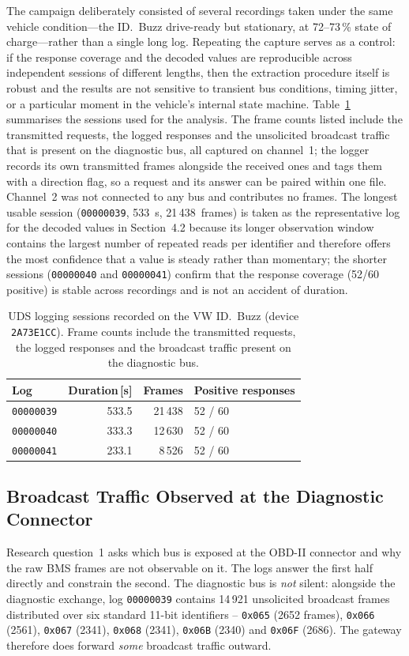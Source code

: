 \documentclass[11pt,a4paper,oneside,parskip=half]{scrreprt}
\providecommand{\hex}{}\renewcommand{\hex}[1]{\texttt{0x#1}}
\begin{document}
The campaign deliberately consisted of several recordings taken under the same vehicle condition---the ID.~Buzz drive-ready but stationary, at 72--73\,\% state of charge---rather than a single long log. Repeating the capture serves as a control: if the response coverage and the decoded values are reproducible across independent sessions of different lengths, then the extraction procedure itself is robust and the results are not sensitive to transient bus conditions, timing jitter, or a particular moment in the vehicle's internal state machine. Table~\ref{tab:uds_logs} summarises the sessions used for the analysis. The frame counts listed include the transmitted requests, the logged responses and the unsolicited broadcast traffic that is present on the diagnostic bus, all captured on channel~1; the logger records its own transmitted frames alongside the received ones and tags them with a direction flag, so a request and its answer can be paired within one file. Channel~2 was not connected to any bus and contributes no frames. The longest usable session (\texttt{00000039}, 533~s, 21\,438~frames) is taken as the representative log for the decoded values in Section~4.2 because its longer observation window contains the largest number of repeated reads per identifier and therefore offers the most confidence that a value is steady rather than momentary; the shorter sessions (\texttt{00000040} and \texttt{00000041}) confirm that the response coverage (52/60 positive) is stable across recordings and is not an accident of duration.

\begin{table}[H]
\caption{UDS logging sessions recorded on the VW ID.~Buzz (device \texttt{2A73E1CC}). Frame counts include the transmitted requests, the logged responses and the broadcast traffic present on the diagnostic bus.}
\label{tab:uds_logs}
\centering
\begin{tabular}{lrrl}
\toprule
\textbf{Log} & \textbf{Duration\,[s]} & \textbf{Frames} & \textbf{Positive responses} \\
\midrule
\texttt{00000039} & 533.5 & 21\,438 & 52 / 60 \\
\texttt{00000040} & 333.3 & 12\,630 & 52 / 60 \\
\texttt{00000041} & 233.1 &  8\,526 & 52 / 60 \\
\bottomrule
\end{tabular}
\end{table}

\subsection{Broadcast Traffic Observed at the Diagnostic Connector}
\label{ssec:broadcast}
Research question~1 asks which bus is exposed at the OBD-II connector and why the raw BMS frames are not observable on it. The logs answer the first half directly and constrain the second. The diagnostic bus is \emph{not} silent: alongside the diagnostic exchange, log \texttt{00000039} contains 14\,921 unsolicited broadcast frames distributed over six standard 11-bit identifiers -- \hex{065} (2652 frames), \hex{066} (2561), \hex{067} (2341), \hex{068} (2341), \hex{06B} (2340) and \hex{06F} (2686). The gateway therefore does forward \emph{some} broadcast traffic outward.
\end{document}
